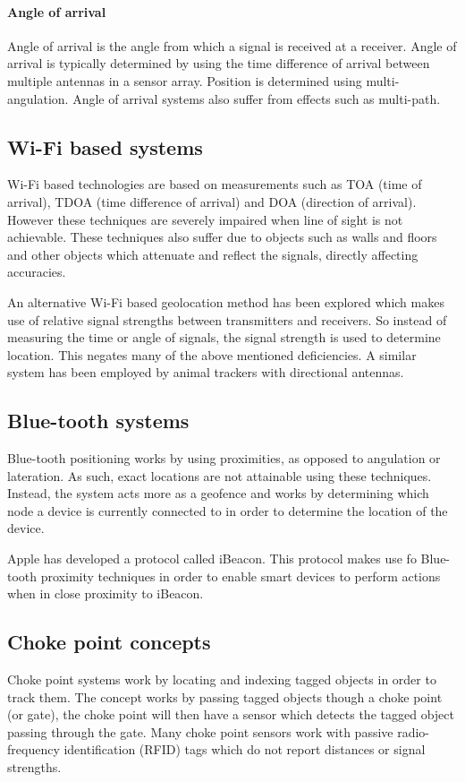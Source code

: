 \documentclass[11pt,a4paper]{report}
\begin{document}
	\paragraph{Angle of arrival}
		Angle of arrival is the angle from which a signal is received at a receiver. Angle of arrival is typically determined by using the time difference of arrival between multiple antennas in a sensor array. Position is determined using multi-angulation.
		Angle of arrival systems also suffer from effects such as multi-path.
	
	\subsection{Wi-Fi based systems}
		Wi-Fi based technologies are based on measurements such as TOA (time of arrival), TDOA (time difference of arrival) and DOA (direction of arrival). However these techniques are severely impaired when line of sight is not achievable. These techniques also suffer due to objects such as walls and floors and other objects which attenuate and reflect the signals, directly affecting accuracies.
	
		An alternative Wi-Fi based geolocation method has been explored which makes use of relative signal strengths between transmitters and receivers. So instead of measuring the time or angle of signals, the signal strength is used to determine location. This negates many of the above mentioned deficiencies. A similar system has been employed by animal trackers with directional antennas.
		\cite{yongguang_chen_signal_2002}
	
	\subsection{Blue-tooth systems}
		Blue-tooth positioning works by using proximities, as opposed to angulation or lateration. As such, exact locations are not attainable using these techniques. Instead, the system acts more as a geofence and works by determining which node a device is currently connected to in order to determine the location of the device.
	
		Apple has developed a protocol called iBeacon. This protocol makes use fo Blue-tooth proximity techniques in order to enable smart devices to perform actions when in close proximity to iBeacon.
		\cite{_everything_????}
	
	\subsection{Choke point concepts}
		Choke point systems work by locating and indexing tagged objects in order to track them. The concept works by passing tagged objects though a choke point (or gate), the choke point will then have a sensor which detects the tagged object passing through the gate. Many choke point sensors work with passive radio-frequency identification (RFID) tags which do not report distances or signal strengths.
		\cite{reza_investigation_2008}
	
\end{document}
